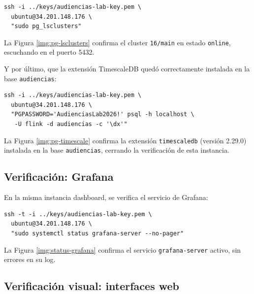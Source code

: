 \begin{lstlisting}[style=cmdbox]
ssh -i ../keys/audiencias-lab-key.pem \
  ubuntu@34.201.148.176 \
  "sudo pg_lsclusters"
\end{lstlisting}

La Figura \ref{img:pg-lsclusters} confirma el cluster \texttt{16/main} en estado \texttt{online}, escuchando en el puerto 5432.


Y por último, que la extensión TimescaleDB quedó correctamente instalada en la base \texttt{audiencias}:

\begin{lstlisting}[style=cmdbox]
ssh -i ../keys/audiencias-lab-key.pem \
  ubuntu@34.201.148.176 \
  "PGPASSWORD='AudienciasLab2026!' psql -h localhost \
   -U flink -d audiencias -c '\dx'"
\end{lstlisting}

La Figura \ref{img:pg-timescale} confirma la extensión \texttt{timescaledb} (versión 2.29.0) instalada en la base \texttt{audiencias}, cerrando la verificación de esta instancia.


\subsection{Verificación: Grafana}

En la misma instancia dashboard, se verifica el servicio de Grafana:

\begin{lstlisting}[style=cmdbox]
ssh -t -i ../keys/audiencias-lab-key.pem \
  ubuntu@34.201.148.176 \
  "sudo systemctl status grafana-server --no-pager"
\end{lstlisting}

La Figura \ref{img:status-grafana} confirma el servicio \texttt{grafana-server} activo, sin errores en su log.


\subsection{Verificación visual: interfaces web}

